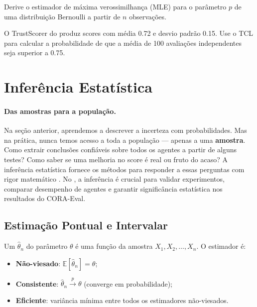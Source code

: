 \begin{exercicio}
    Derive o estimador de máxima verossimilhança (MLE) para o parâmetro $p$
    de uma distribuição Bernoulli a partir de $n$ observações.
\end{exercicio}

\begin{exercicio}
    O TrustScorer do \opencodeeco{} produz scores com média 0.72 e desvio
    padrão 0.15. Use o TCL para calcular a probabilidade de que a média de
    100 avaliações independentes seja superior a 0.75.
\end{exercicio}

\section{Inferência Estatística}
\label{sec:inferencia-estatistica}
\nivelavancado

\paragraph{Das amostras para a população.} Na seção anterior, aprendemos a
descrever a incerteza com probabilidades. Mas na prática, nunca temos acesso
a toda a população --- apenas a uma \textbf{amostra}. Como extrair conclusões
confiáveis sobre todos os agentes a partir de alguns testes? Como saber se
uma melhoria no score é real ou fruto do acaso? A inferência estatística
fornece os métodos para responder a essas perguntas com rigor matemático
\cite{wasserman2004all, hastie2009elements, box1976science}. No
\opencodeeco{}, a inferência é crucial para validar experimentos, comparar
desempenho de agentes e garantir significância estatística nos resultados do
CORA-Eval.

\subsection{Estimação Pontual e Intervalar}

\begin{definicao}[Estimador]
    Um  $\hat{\theta}_n$ do parâmetro $\theta$ é uma
    função da amostra $X_1, X_2, \ldots, X_n$. O estimador é:
    \begin{itemize}
        \item \textbf{Não-viesado}: $\mathbb{E}[\hat{\theta}_n] = \theta$;
        \item \textbf{Consistente}: $\hat{\theta}_n \xrightarrow{p} \theta$
              (converge em probabilidade);
        \item \textbf{Eficiente}: variância mínima entre todos os estimadores
              não-viesados.
    \end{itemize}
\end{definicao}

